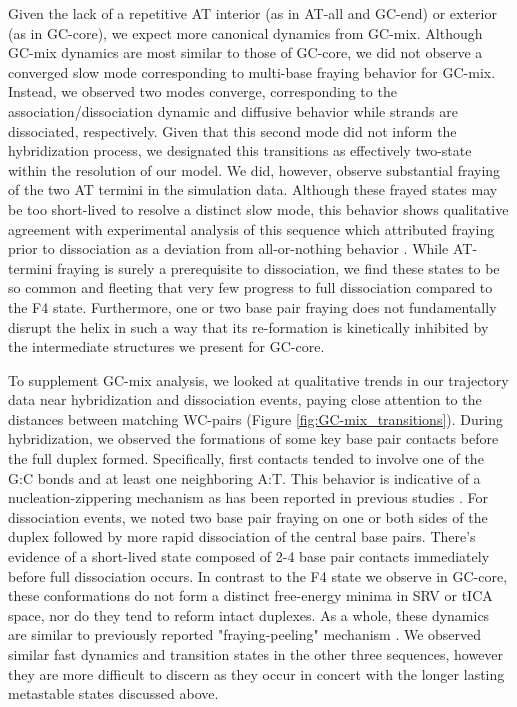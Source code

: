 \documentclass[journal=jpcbfk,manuscript=article]{achemso}
\begin{document}
Given the lack of a repetitive AT interior (as in AT-all and GC-end) or exterior (as in GC-core), we expect more canonical dynamics from GC-mix. Although GC-mix dynamics are most similar to those of GC-core, we did not observe a converged slow mode corresponding to multi-base fraying behavior for GC-mix. Instead, we observed two modes converge, corresponding to the association/dissociation dynamic and diffusive behavior while strands are dissociated, respectively. Given that this second mode did not inform the hybridization process, we designated this transitions as effectively two-state within the resolution of our model. We did, however, observe substantial fraying of the two AT termini in the simulation data. Although these frayed states may be too short-lived to resolve a distinct slow mode, this behavior shows qualitative agreement with experimental analysis of this sequence which attributed fraying prior to dissociation as a deviation from all-or-nothing behavior \citep{Sanstead2016}.  While AT-termini fraying is surely a prerequisite to dissociation, we find these states to be so common and fleeting that very few progress to full dissociation compared to the F4 state. Furthermore, one or two base pair fraying does not fundamentally disrupt the helix in such a way that its re-formation is kinetically inhibited by the intermediate structures we present for GC-core.  

To supplement GC-mix analysis, we looked at qualitative trends in our trajectory data near hybridization and dissociation events, paying close attention to the distances between matching WC-pairs (Figure \ref{fig:GC-mix_transitions}). During hybridization, we observed the formations of some key base pair contacts before the full duplex formed. Specifically, first contacts tended to involve one of the G:C bonds and at least one neighboring A:T. This behavior is indicative of a nucleation-zippering mechanism as has been reported in previous studies \citep{Wetmur1968KineticsDNA, Porschke1971CooperativeTransition, Yin2011KineticsHybridization}. For dissociation events, we noted two base pair fraying on one or both sides of the duplex followed by more rapid dissociation of the central base pairs. There's evidence of a short-lived state composed of 2-4 base pair contacts immediately before full dissociation occurs. In contrast to the F4 state we observe in GC-core, these conformations do not form a distinct free-energy minima in SRV or tICA space, nor do they tend to reform intact duplexes. As a whole, these dynamics are similar to previously reported "fraying-peeling" mechanism \citep{Wong2008TheSimulations, Perez2010Real-timeUnfolding, Zgarbova2014BaseRNA}. We observed similar fast dynamics and transition states in the other three sequences, however they are more difficult to discern as they occur in concert with the longer lasting metastable states discussed above.
\end{document}
